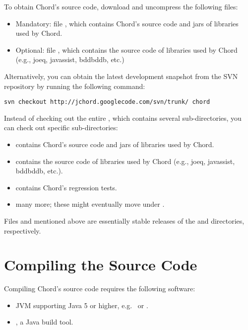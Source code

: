 To obtain Chord's source code, download and uncompress the following files:

\begin{itemize}
\item
Mandatory: file
\chordsrcfile, which contains Chord's source code and jars of libraries used by
Chord.
\item
Optional: file \chordlibfile, which contains the source code of libraries used
by Chord (e.g., joeq, javassist, bddbddb, etc.)
\end{itemize}

Alternatively, you can obtain the latest development snapshot from the SVN
repository by running the following command:

\begin{framed}
\begin{verbatim}
svn checkout http://jchord.googlecode.com/svn/trunk/ chord
\end{verbatim}
\end{framed}

Instead of checking out the entire , which contains several
sub-directories, you can check out specific sub-directories:

\begin{itemize}
\item
{} contains Chord's source code and jars of libraries used by Chord.
\item
{} contains the source code of libraries used by Chord (e.g., joeq,
javassist, bddbddb, etc.).
\item
{} contains Chord's regression tests.
\item
many more; these might eventually move under .
\end{itemize}

Files  and  mentioned
above are essentially stable releases of the  and 
directories, respectively.

\section{Compiling the Source Code}
\label{sec:compiling-sources}

Compiling Chord's source code requires the following software:

\begin{itemize}
\item
JVM supporting Java 5 or higher, e.g. \ibmjvm\ or \sunjvm.
\item
\ant, a Java build tool.
\end{itemize}

